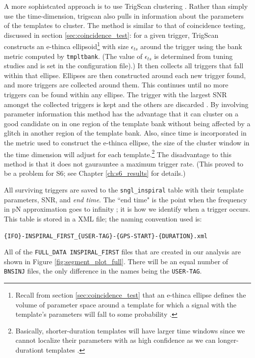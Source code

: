 A more sophistcated approach is to use TrigScan clustering
\cite{SenguptaTrigScan, Keppel:thesis}. Rather than simply use the
time-dimension, trigscan also pulls in information about the parameters of the
templates to cluster. The method is similar to that of coincidence testing,
discussed in section \ref{sec:coincidence_test}: for a given trigger, TrigScan
constructs an e-thinca ellipsoid\footnote{Recall from section
\ref{sec:coincidence_test} that an e-thinca ellipse defines the volume of
parameter space around a template for which a signal with the template's
parameters will fall to some probability \cite{Robinson:2008}.} with size
$\epsilon_{ts}$ around the trigger using the bank metric computed by
\texttt{tmpltbank}. (The value of $\epsilon_{ts}$ is determined from tuning
studies and is set in the configuration file).) It then collects all triggers
that fall within that ellipse. Ellipses are then constructed around each new
trigger found, and more triggers are collected around them. This continues
until no more triggers can be found within any ellipse. The trigger with the
largest \ac{SNR} amongst the collected triggers is kept and the others are
discarded \cite{SenguptaTrigScan, Keppel:thesis}. By involving parameter
information this method has the advantage that it can cluster on a good
candidate on in one region of the template bank without being affected by a
glitch in another region of the template bank. Also, since time is incorporated
in the metric used to construct the e-thinca ellipse, the size of the cluster
window in the time dimension will adjust for each template.\footnote{Basically,
shorter-duration templates will have larger time windows since we cannot
localize their parameters with as high confidence as we can longer-durationt
templates \cite{SenguptaTrigScan}.} The disadvantage to this method is that it
does not gaurauntee a maximum trigger rate. (This proved to be a problem for
\ac{S6}; see Chapter \ref{ch:s6_results} for details.)

All surviving triggers are saved to the \texttt{sngl\_inspiral} table with
their template parameters, \ac{SNR}, and \emph{end time}. The ``end time" is
the point when the frequency in \ac{pN} approximation goes to infinity
\cite{Brown}; it is how we identify when a trigger occurs. This table is stored
in a XML file; the naming convention used is:
\begin{center}
\texttt{\{IFO\}-INSPIRAL\_FIRST\_\{USER-TAG\}-\{GPS-START\}-\{DURATION\}.xml}
\end{center}
All of the \texttt{FULL\_DATA INSPIRAL\_FIRST} files that are created in our
analysis are shown in Figure \ref{fig:segment_plot_full}. There will be an
equal number of \texttt{BNSINJ} files, the only difference in the names being
the \texttt{USER-TAG}.

